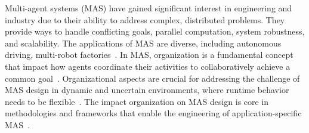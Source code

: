 \documentclass[runningheads]{llncs}
\begin{document}
Multi-agent systems (MAS) have gained significant interest in engineering and industry due to their ability to address complex, distributed problems. They provide ways to handle conflicting goals, parallel computation, system robustness, and scalability. The applications of MAS are diverse, including autonomous driving, multi-robot factories~\cite{Oliveira1999, Gembarski2020}. %
In MAS, organization is a fundamental concept that impact how agents coordinate their activities to collaboratively achieve a common goal~\cite{Hubner2002}.
Organizational aspects are crucial for addressing the challenge of MAS design in dynamic and uncertain environments, where runtime behavior needs to be flexible~\cite{Kathleen2020}. The impact organization on MAS design is core in methodologies and frameworks that enable the engineering of application-specific MAS~\cite{Noel2010}. %

\end{document}
